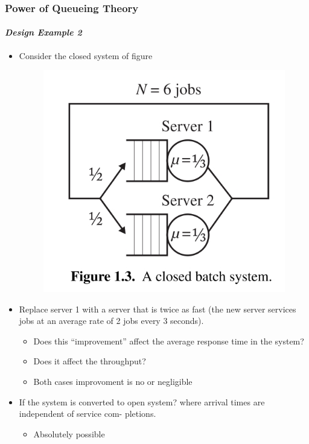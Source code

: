 \documentclass{beamer}
\begin{document}
\begin{frame}
    \frametitle{Power of Queueing Theory}
    \framesubtitle{\textbf{\textit{Design Example 2}}}
	\begin{itemize}
		\item Consider the closed system of figure 
			\begin{figure}
        		\begin{center}
		            \includegraphics[scale=0.12]{images/closedbatchsystem.jpg}
        		\end{center}
		    \end{figure}
		\item Replace server 1 with a server that is twice as fast (the new server services jobs 						at an average rate of 2 jobs every 3 seconds).
		\begin{itemize}
			\item Does this “improvement” affect the average response time in the system?  
			\item Does it affect the throughput? 
			\item Both cases improvoment is no or negligible
		\end{itemize}
		\item If the system is converted to open system? where arrival times are independent of 						service com- pletions. 
			\begin{itemize}
				\item Absolutely possible
			\end{itemize}
	\end{itemize}	    
    
\end{frame}
\end{document}
